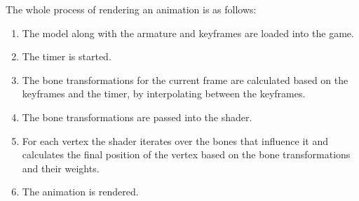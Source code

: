 The whole process of rendering an animation is as follows:
\begin{enumerate}
    \item The model along with the armature and keyframes are loaded into the game.
    \item The timer is started.
    \item The bone transformations for the current frame are calculated based on the keyframes and the timer, by interpolating between the keyframes.
    \item The bone transformations are passed into the shader.
    \item For each vertex the shader iterates over the bones that influence it and calculates the final position of the vertex based on the bone transformations and their weights.
    \item The animation is rendered.
\end{enumerate}